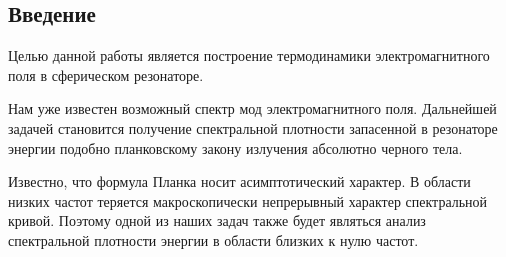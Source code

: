 %
%
%
%
%
%

\subsection*{Введение}

    Целью данной работы является построение термодинамики электромагнитного поля в сферическом резонаторе.

    Нам уже известен возможный спектр мод электромагнитного поля. Дальнейшей задачей становится получение спектральной плотности запасенной в резонаторе энергии подобно планковскому закону излучения абсолютно черного тела.

    Известно, что формула Планка носит асимптотический характер. В области низких частот теряется макроскопически непрерывный характер спектральной кривой. Поэтому одной из наших задач также будет являться анализ спектральной плотности энергии в области близких к нулю частот.
